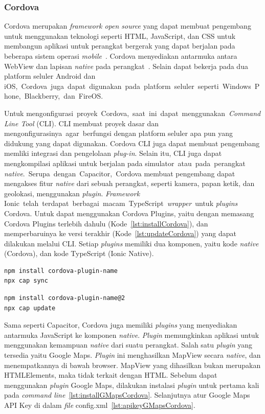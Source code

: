 \subsubsection{Cordova}
\label{subsec:cordova}
Cordova merupakan {\it framework open source} yang dapat membuat pengembang untuk menggunakan teknologi seperti HTML, JavaScript, dan CSS untuk membangun aplikasi untuk perangkat bergerak yang dapat berjalan pada beberapa sistem operasi {\it mobile}~\cite{gonsalves:18:evaluating}. Cordova menyediakan antarmuka antara WebView dan lapisan {\it native} pada perangkat~\cite{griffith:17:mobile}. Selain dapat bekerja pada dua platform seluler Android dan iOS,~Cordova~juga~dapat~digunakan~pada~platform~seluler~seperti~Windows~Phone,~Blackberry,~dan~FireOS.

Untuk mengonfigurasi~proyek~Cordova,~saat~ini~dapat~menggunakan~{\it Command Line Tool} (CLI). CLI membuat proyek dasar dan mengonfigurasinya~agar~berfungsi dengan platform seluler apa pun yang didukung yang dapat digunakan. Cordova CLI juga dapat membuat pengembang memliki integrasi dan pengelolaan {\it plug-in}. Selain itu, CLI juga dapat mengkompilasi aplikasi untuk berjalan pada simulator~atau~pada~perangkat {\it native}.~Serupa~dengan~Capacitor,~Cordova membuat pengembang dapat mengakses fitur {\it native} dari sebuah perangkat, seperti kamera, papan ketik, dan geolokasi, menggunakan {\it plugin}. {\it Framework} Ionic~telah~terdapat~berbagai~macam~TypeScript~{\it wrapper}~untuk {\it plugins} Cordova.  Untuk dapat menggunakan Cordova Plugins, yaitu dengan memasang Cordova Plugins terlebih dahulu (Kode~\ref{lst:installCordova}), dan memperbaruinya ke versi terakhir (Kode~\ref{lst:updateCordova}) yang dapat dilakukan melalui CLI. Setiap {\it plugins} memiliki dua komponen, yaitu kode {\it native} (Cordova), dan kode TypeScript (Ionic Native).

\begin{lstlisting}[label={lst:installCordova}, caption=Kode untuk Memasang Cordova Plugins]
npm install cordova-plugin-name
npx cap sync
\end{lstlisting} 

\begin{lstlisting}[label={lst:updateCordova}, caption=Kode untuk Memperbarui Cordova Plugins]
npm install cordova-plugin-name@2
npx cap update
\end{lstlisting} 

Sama seperti Capacitor, Cordova juga memiliki \textit{plugins} yang menyediakan antarmuka JavaScript ke komponen \textit{native}. \textit{Plugin} memungkinkan aplikasi untuk menggunakan kemampuan \textit{native} dari suatu perangkat. Salah satu \textit{plugin} yang tersedia yaitu Google Maps. \textit{Plugin} ini menghasilkan MapView secara \textit{native}, dan menempatkannya di bawah browser. MapView yang dihasilkan bukan merupakan HTMLElements, maka tidak terkait dengan HTML. Sebelum dapat menggunakan \textit{plugin} Google Maps, dilakukan instalasi \textit{plugin} untuk pertama kali pada \textit{command line}~\ref{lst:installGMapsCordova}. Selanjutnya atur Google Maps API Key di dalam \textit{file} config.xml~\ref{lst:apikeyGMapsCordova}. 

